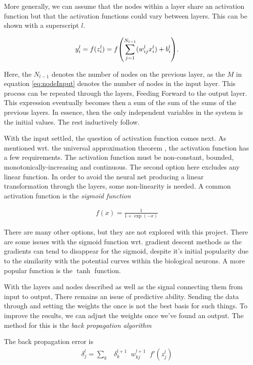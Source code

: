 \documentclass[10pt]{article}
\begin{document}
More generally, we can assume that the nodes within a layer share an activation function
but that the activation functions could vary between layers. This can be shown with a superscript
$l$.

\begin{align}
	y^l_i = f(z^l_i) = f\qty(\sum_{j=1}^{N_{l-1}}( w^l_{ij}x^l_i ) + b^l_i ).
\end{align}

Here, the $N_{l-1}$ denotes the number of nodes on the previous layer, as the
$M$ in equation \ref{eq:nodeInput} denotes the number of nodes in the input
layer. This process can be repeated through the layers, Feeding Forward to the
output layer. This expression eventually becomes then a sum of the sum of the
sums of the previous layers. In essence, then the only independent variables in
the system is the initial values. The rest inductively follow. 

With the input settled, the question of activation function comes next. As
mentioned wrt. the universal approximation theorem , the activation function
has a few requirements. The activation function must be non-constant, bounded,
monotonically-increasing and continuous. The second option here excludes any
linear function. In order to avoid the neural net producing a linear
transformation through the layers, some non-linearity is needed. A common
activation function is the \emph{sigmoid function}

\begin{align}
	f(x) = \frac{1}{1 + \exp(-x)}
	\label{eq:sigmoid}
\end{align}

There are many other options, but they are not explored with this project.
There are some issues with the sigmoid function wrt. gradient descent methods
as the gradients can tend to disappear for the sigmoid, despite it's initial
popularity due to the similarity with the potential curves within the
biological neurons. A more popular function is the $\tanh$ function. 

With the layers and nodes described as well as the signal connecting them from
input to output, There remains an issue of predictive ability. Sending the data
through and setting the weights the once is not the best basis for such things.
To improve the results, we can adjust the weights once we've found an output.
The method for this is the \emph{back propagation algorithm}

The back propagation error is
\begin{align}
	\delta^l_j = \sum_k \;\;\;\delta^{l+1}_k \;\; w^{l+1}_{kj} \;\; f'(z^l_j)
\end{align}
\end{document}

